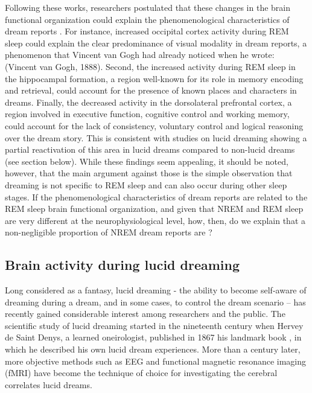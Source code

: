 Following these works, researchers postulated that these changes in the brain functional organization could explain the phenomenological characteristics of dream reports \citep{hobson_dreaming_2000, schwartz_sleep_2002, maquet_human_2005, nir_dreaming_2010, ruby_experimental_2011}. For instance, increased occipital cortex activity during REM sleep could explain the clear predominance of visual modality in dream reports, a phenomenon that Vincent van Gogh had already noticed when he wrote:  (Vincent van Gogh, 1888). Second, the increased activity during REM sleep in the hippocampal formation, a region well-known for its role in memory encoding and retrieval, could account for the presence of known places and characters in dreams. Finally, the decreased activity in the dorsolateral prefrontal cortex, a region involved in executive function, cognitive control and working memory, could account for the lack of consistency, voluntary control and logical reasoning over the dream story. This is consistent with studies on lucid dreaming showing a partial reactivation of this area in lucid dreams compared to non-lucid dreams (see section below). While these findings seem appealing, it should be noted, however, that the main argument against those is the simple observation that dreaming is not specific to REM sleep and can also occur during other sleep stages. If the phenomenological characteristics of dream reports are related to the REM sleep brain functional organization, and given that NREM and REM sleep are very different at the neurophysiological level, how, then, do we explain that a non-negligible proportion of NREM dream reports are  \citep{hobson_dreaming_1988}?

\subsection{Brain activity during lucid dreaming}
\label{sec:dream-research:attempts:ba-lucid}

Long considered as a fantasy, lucid dreaming - the ability to become self-aware of dreaming during a dream, and in some cases, to control the dream scenario – has recently gained considerable interest among researchers and the public. The scientific study of lucid dreaming started in the nineteenth century when Hervey de Saint Denys, a learned oneirologist, published in 1867 his landmark book , in which he described his own lucid dream experiences. More than a century later, more objective methods such as EEG and functional magnetic resonance imaging (fMRI) have become the technique of choice for investigating the cerebral correlates lucid dreams.

